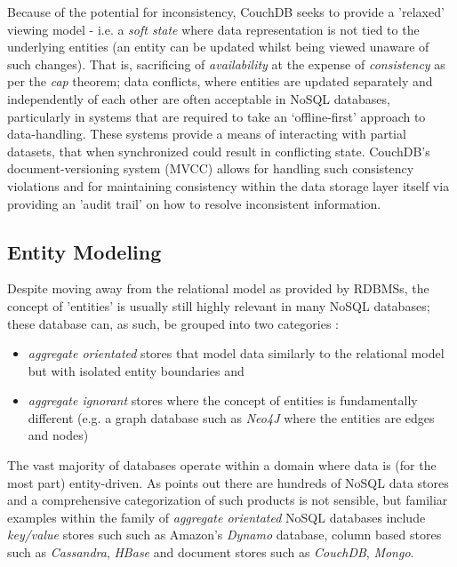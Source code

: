 Because of the potential for inconsistency, CouchDB seeks to provide a 'relaxed' viewing model - i.e. a \textit{soft state} where data representation is not tied to the underlying entities (an entity can be updated whilst being viewed unaware of such changes). That is, sacrificing of \textit{availability} at the expense of \textit{consistency} as per the \textit{cap} theorem; data conflicts, where entities are updated separately and independently of each other are often acceptable in NoSQL databases, particularly in systems that are required to take an `offline-first' approach to data-handling. These systems provide a means of interacting with partial datasets, that when synchronized could result in conflicting state. CouchDB's document-versioning system (MVCC) allows for handling such consistency violations and for maintaining consistency within the data storage layer itself via providing an 'audit trail' on how to resolve inconsistent information.

\subsection{Entity Modeling}
Despite moving away from the relational model as provided by RDBMSs, the concept of 'entities' is usually still highly relevant in many NoSQL databases; these database can, as such, be grouped into two categories \cite{fowlerAggregate}:

\begin{itemize}
    \item \textit{aggregate orientated} stores that model data similarly to the relational model but with isolated entity boundaries and
    \item \textit{aggregate ignorant} stores where the concept of entities is fundamentally different (e.g. a graph database such as \textit{Neo4J} where the entities are edges and nodes)
\end{itemize}

The vast majority of databases operate within a domain where data is (for the most part) entity-driven. As \cite{GANESHCHANDRA201513} points out there are hundreds of NoSQL data stores and a comprehensive categorization of such products is not sensible, but familiar examples within the family of \textit{aggregate orientated} NoSQL databases include \textit{key/value} stores such such as Amazon's \textit{Dynamo} database, column based stores such as \textit{Cassandra}, \textit{HBase} and document stores such as \textit{CouchDB}, \textit{Mongo}.

